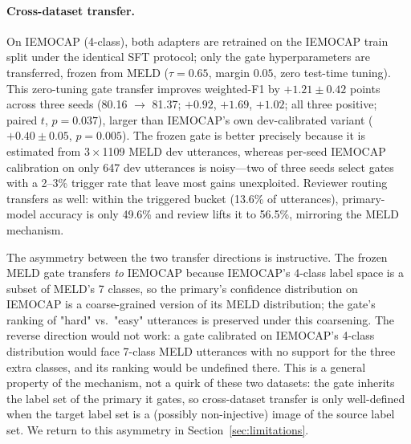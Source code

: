 \documentclass[final,5p,times,twocolumn]{elsarticle}
\begin{document}
\paragraph{Cross-dataset transfer.}
On IEMOCAP (4-class), both adapters are retrained on the IEMOCAP train
split under the identical SFT protocol; only the gate hyperparameters are
transferred, frozen from MELD ($\tau{=}0.65$, margin $0.05$, zero
test-time tuning). This zero-tuning gate transfer improves
weighted-F1 by $+1.21 \pm 0.42$ points across three seeds (80.16 $\to$ 81.37;
$+0.92$, $+1.69$, $+1.02$; all three positive; paired $t$, $p{=}0.037$),
larger than IEMOCAP's own dev-calibrated variant ($+0.40 \pm 0.05$,
$p{=}0.005$). The frozen gate is better precisely because it is estimated
from $3\times$1109 MELD dev utterances, whereas per-seed IEMOCAP calibration
on only 647 dev utterances is noisy---two of three seeds select gates with a
2--3\% trigger rate that leave most gains unexploited. Reviewer routing
transfers as well: within the triggered bucket (13.6\% of utterances),
primary-model accuracy is only 49.6\% and review lifts it to 56.5\%,
mirroring the MELD mechanism.

The asymmetry between the two transfer directions is instructive. The
frozen MELD gate transfers \emph{to} IEMOCAP because IEMOCAP's 4-class
label space is a subset of MELD's 7 classes, so the primary's confidence
distribution on IEMOCAP is a coarse-grained version of its MELD
distribution; the gate's ranking of "hard" vs.\ "easy" utterances is
preserved under this coarsening. The reverse direction would not work: a
gate calibrated on IEMOCAP's 4-class distribution would face 7-class MELD
utterances with no support for the three extra classes, and its ranking
would be undefined there. This is a general property of the mechanism, not
a quirk of these two datasets: the gate inherits the label set of the
primary it gates, so cross-dataset transfer is only well-defined when the
target label set is a (possibly non-injective) image of the source label
set. We return to this asymmetry in Section~\ref{sec:limitations}.
\end{document}
